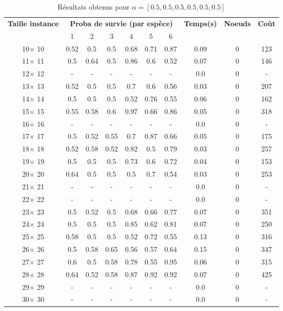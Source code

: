 \documentclass[main.tex]{subfiles}
\begin{document}
\begin{table}
\centering
\caption{Résultats obtenus pour $\alpha = [0.5, 0.5, 0.5, 0.5, 0.5, 0.5]$}
\begin{tabular}{|c||c|c|c|c|c|c||c|c|c|}
\hline
\textbf{Taille instance}&\multicolumn{6}{c}{\textbf{Proba de survie (par espèce)}}&\textbf{Temps(s)}&\textbf{Noeuds}&\textbf{Coût}\\
&1&2&3&4&5&6& & &\\
\hline

10$\times$ 10 &0.52 &0.5 &0.5 &0.68 &0.71 &0.87 &0.09 &0 &123\\
11$\times$ 11 &0.5 &0.64 &0.5 &0.86 &0.6 &0.52 &0.07 &0 &146\\
12$\times$ 12 & - & - & - & - & - & - &0.0 &0 &-\\
13$\times$ 13 &0.52 &0.5 &0.5 &0.7 &0.6 &0.56 &0.03 &0 &207\\
14$\times$ 14 &0.5 &0.5 &0.5 &0.52 &0.76 &0.55 &0.06 &0 &162\\
15$\times$ 15 &0.55 &0.58 &0.6 &0.97 &0.66 &0.86 &0.05 &0 &318\\
16$\times$ 16 & - & - & - & - & - & - &0.0 &0 &-\\
17$\times$ 17 &0.5 &0.52 &0.55 &0.7 &0.87 &0.66 &0.05 &0 &175\\
18$\times$ 18 &0.52 &0.58 &0.52 &0.82 &0.5 &0.79 &0.03 &0 &257\\
19$\times$ 19 &0.5 &0.5 &0.5 &0.73 &0.6 &0.72 &0.04 &0 &153\\
20$\times$ 20 &0.64 &0.5 &0.5 &0.5 &0.7 &0.54 &0.03 &0 &253\\
21$\times$ 21 & - & - & - & - & - & - &0.0 &0 &-\\
22$\times$ 22 & - & - & - & - & - & - &0.0 &0 &-\\
23$\times$ 23 &0.5 &0.52 &0.5 &0.68 &0.66 &0.77 &0.07 &0 &351\\
24$\times$ 24 &0.5 &0.5 &0.5 &0.85 &0.62 &0.81 &0.07 &0 &250\\
25$\times$ 25 &0.58 &0.5 &0.5 &0.52 &0.72 &0.55 &0.13 &0 &316\\
26$\times$ 26 &0.5 &0.58 &0.65 &0.56 &0.57 &0.64 &0.15 &0 &347\\
27$\times$ 27 &0.6 &0.5 &0.58 &0.78 &0.55 &0.95 &0.06 &0 &315\\
28$\times$ 28 &0.64 &0.52 &0.58 &0.87 &0.92 &0.92 &0.07 &0 &425\\
29$\times$ 29 & - & - & - & - & - & - &0.0 &0 &-\\
30$\times$ 30 & - & - & - & - & - & - &0.0 &0 &-\\

\end{tabular}
\end{table}
\end{document}
